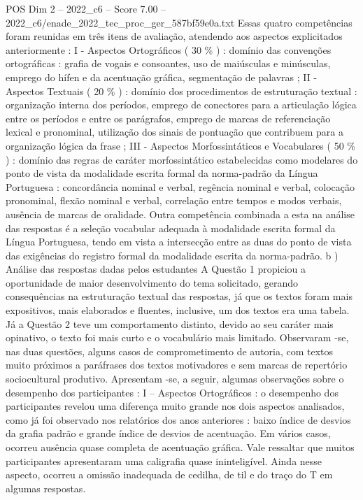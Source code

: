 \begin{textsample}{POS Dim 2 – 2022\_c6 – Score 7.00 – 2022\_c6/enade\_2022\_tec\_proc\_ger\_587bf59e0a.txt}
Essas quatro competências foram reunidas em três itens de avaliação, atendendo aos aspectos explicitados anteriormente : I - Aspectos Ortográficos ( 30 \% ) : domínio das convenções ortográficas : grafia de vogais e consoantes, uso de maiúsculas e minúsculas, emprego do hífen e da acentuação gráfica, segmentação de palavras ; II - Aspectos Textuais ( 20 \% ) : domínio dos procedimentos de estruturação textual : organização interna dos períodos, emprego de conectores para a articulação lógica entre os períodos e entre os parágrafos, emprego de marcas de referenciação lexical e pronominal, utilização dos sinais de pontuação que contribuem para a organização lógica da frase ; III - Aspectos Morfossintáticos e Vocabulares ( 50 \% ) : domínio das regras de caráter morfossintático estabelecidas como modelares do ponto de vista da modalidade escrita formal da norma-padrão da Língua Portuguesa : concordância nominal e verbal, regência nominal e verbal, colocação pronominal, flexão nominal e verbal, correlação entre tempos e modos verbais, ausência de marcas de oralidade.
Outra competência combinada a esta na análise das respostas é a seleção vocabular adequada à modalidade escrita formal da Língua Portuguesa, tendo em vista a intersecção entre as duas do ponto de vista das exigências do registro formal da modalidade escrita da norma-padrão. b ) Análise das respostas dadas pelos estudantes A Questão 1 propiciou a oportunidade de maior desenvolvimento do tema solicitado, gerando consequências na estruturação textual das respostas, já que os textos foram mais expositivos, mais elaborados e fluentes, inclusive, um dos textos era uma tabela.
Já a Questão 2 teve um comportamento distinto, devido ao seu caráter mais opinativo, o texto foi mais curto e o vocabulário mais limitado.
Observaram -se, nas duas questões, alguns casos de comprometimento de autoria, com textos muito próximos a paráfrases dos textos motivadores e sem marcas de repertório sociocultural produtivo.
Apresentam -se, a seguir, algumas observações sobre o desempenho dos participantes : I – Aspectos Ortográficos : o desempenho dos participantes revelou uma diferença muito grande nos dois aspectos analisados, como já foi observado nos relatórios dos anos anteriores : baixo índice de desvios da grafia padrão e grande índice de desvios de acentuação.
Em vários casos, ocorreu ausência quase completa de acentuação gráfica.
Vale ressaltar que muitos participantes apresentaram uma caligrafia quase ininteligível.
Ainda nesse aspecto, ocorreu a omissão inadequada de cedilha, de til e do traço do T em algumas respostas.

\end{textsample}
